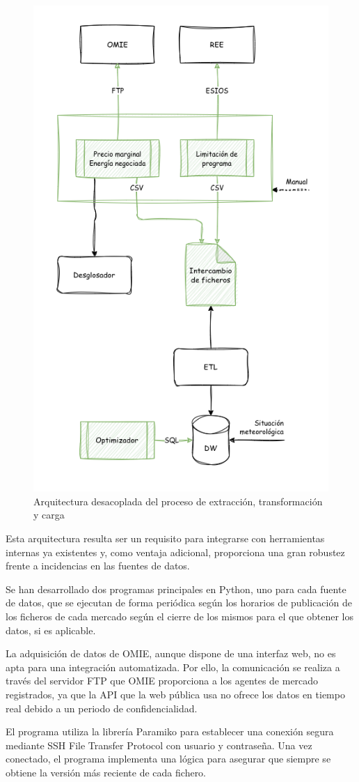 \begin{figure}
\centering
\includegraphics[width=0.5\linewidth]{figures/arquitectura-mercado.png}
\caption{Arquitectura desacoplada del proceso de extracción, transformación y carga}
\label{fig:arquitectura-mercado}
\end{figure}

Esta arquitectura resulta ser un requisito para integrarse con herramientas internas ya existentes y, como ventaja adicional, proporciona una gran robustez frente a incidencias en las fuentes de datos.

Se han desarrollado dos programas principales en Python, uno para cada fuente de datos, que se ejecutan de forma periódica según los horarios de publicación de los ficheros de cada mercado según el cierre de los mismos para el que obtener los datos, si es aplicable.

La adquisición de datos de OMIE, aunque dispone de una interfaz web, no es apta para una integración automatizada. Por ello, la comunicación se realiza a través del servidor FTP que OMIE proporciona a los agentes de mercado registrados, ya que la API que la web pública usa no ofrece los datos en tiempo real debido a un periodo de confidencialidad.

El programa utiliza la librería Paramiko para establecer una conexión segura mediante SSH File Transfer Protocol con usuario y contraseña. Una vez conectado, el programa implementa una lógica para asegurar que siempre se obtiene la versión más reciente de cada fichero.

